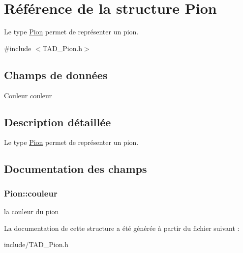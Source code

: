 \hypertarget{structPion}{\section{Référence de la structure Pion}
\label{structPion}
}


Le type \hyperlink{structPion}{Pion} permet de représenter un pion.  




{\ttfamily \#include $<$T\-A\-D\-\_\-\-Pion.\-h$>$}

\subsection*{Champs de données}
\begin{DoxyCompactItemize}
\item 
\hyperlink{TAD__Couleur_8h_aa304d0ca681f782b1d7735da33037dd7}{Couleur} \hyperlink{structPion_a7e0f0e4140007d6bb17b9939cb494f0c}{couleur}
\end{DoxyCompactItemize}


\subsection{Description détaillée}
Le type \hyperlink{structPion}{Pion} permet de représenter un pion. 

\subsection{Documentation des champs}
\hypertarget{structPion_a7e0f0e4140007d6bb17b9939cb494f0c}{
\subsubsection[{couleur}]{ Pion\-::couleur}}\label{structPion_a7e0f0e4140007d6bb17b9939cb494f0c}
la couleur du pion 

La documentation de cette structure a été générée à partir du fichier suivant \-:\begin{DoxyCompactItemize}
\item 
include/T\-A\-D\-\_\-\-Pion.\-h\end{DoxyCompactItemize}
